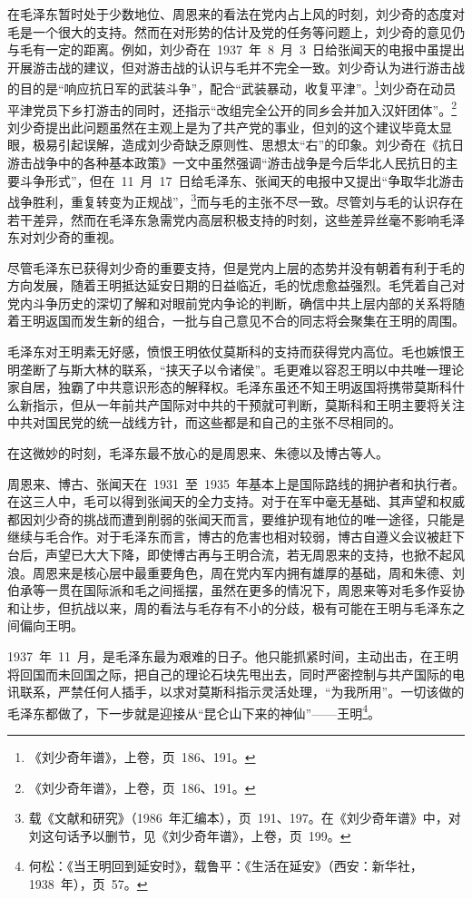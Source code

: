 在毛泽东暂时处于少数地位、周恩来的看法在党内占上风的时刻，刘少奇的态度对毛是一个很大的支持。然而在对形势的估计及党的任务等问题上，刘少奇的意见仍与毛有一定的距离。例如，刘少奇在~1937~年~8~月~3~日给张闻天的电报中虽提出开展游击战的建议，但对游击战的认识与毛并不完全一致。刘少奇认为进行游击战的目的是“响应抗日军的武装斗争”，配合“武装暴动，收复平津”。\footnote{《刘少奇年谱》，上卷，页~186、191。}刘少奇在动员平津党员下乡打游击的同时，还指示“改组完全公开的同乡会并加入汉奸团体”。\footnote{《刘少奇年谱》，上卷，页~186、191。}刘少奇提出此问题虽然在主观上是为了共产党的事业，但刘的这个建议毕竟太显眼，极易引起误解，造成刘少奇缺乏原则性、思想太“右”的印象。刘少奇在《抗日游击战争中的各种基本政策》一文中虽然强调“游击战争是今后华北人民抗日的主要斗争形式”，但在~11~月~17~日给毛泽东、张闻天的电报中又提出“争取华北游击战争胜利，重复转变为正规战”，\footnote{载《文献和研究》（1986~年汇编本），页~191、197。在《刘少奇年谱》中，对刘这句话予以删节，见《刘少奇年谱》，上卷，页~199。}而与毛的主张不尽一致。尽管刘与毛的认识存在若干差异，然而在毛泽东急需党内高层积极支持的时刻，这些差异丝毫不影响毛泽东对刘少奇的重视。

尽管毛泽东已获得刘少奇的重要支持，但是党内上层的态势并没有朝着有利于毛的方向发展，随着王明抵达延安日期的日益临近，毛的忧虑愈益强烈。毛凭着自己对党内斗争历史的深切了解和对眼前党内争论的判断，确信中共上层内部的关系将随着王明返国而发生新的组合，一批与自己意见不合的同志将会聚集在王明的周围。

毛泽东对王明素无好感，愤恨王明依仗莫斯科的支持而获得党内高位。毛也嫉恨王明垄断了与斯大林的联系，“挟天子以令诸侯”。毛更难以容忍王明以中共唯一理论家自居，独霸了中共意识形态的解释权。毛泽东虽还不知王明返国将携带莫斯科什么新指示，但从一年前共产国际对中共的干预就可判断，莫斯科和王明主要将关注中共对国民党的统一战线方针，而这些都是和自己的主张不尽相同的。

在这微妙的时刻，毛泽东最不放心的是周恩来、朱德以及博古等人。

周恩来、博古、张闻天在~1931~至~1935~年基本上是国际路线的拥护者和执行者。在这三人中，毛可以得到张闻天的全力支持。对于在军中毫无基础、其声望和权威都因刘少奇的挑战而遭到削弱的张闻天而言，要维护现有地位的唯一途径，只能是继续与毛合作。对于毛泽东而言，博古的危害也相对较弱，博古自遵义会议被赶下台后，声望已大大下降，即使博古再与王明合流，若无周恩来的支持，也掀不起风浪。周恩来是核心层中最重要角色，周在党内军内拥有雄厚的基础，周和朱德、刘伯承等一贯在国际派和毛之间摇摆，虽然在更多的情况下，周恩来等对毛多作妥协和让步，但抗战以来，周的看法与毛存有不小的分歧，极有可能在王明与毛泽东之间偏向王明。

1937~年~11~月，是毛泽东最为艰难的日子。他只能抓紧时间，主动出击，在王明将回国而未回国之际，把自己的理论石块先甩出去，同时严密控制与共产国际的电讯联系，严禁任何人插手，以求对莫斯科指示灵活处理，“为我所用”。一切该做的毛泽东都做了，下一步就是迎接从“昆仑山下来的神仙”——王明\footnote{何松：《当王明回到延安时》，载鲁平：《生活在延安》（西安：新华社，1938~年），页~57。}。

